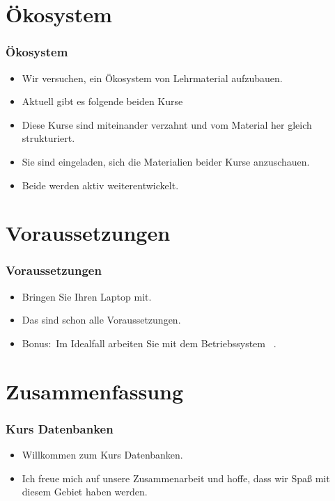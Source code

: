 \documentclass[aspectratio=169,mathserif,notheorems]{beamer}%
\begin{document}
\section{Ökosystem}%
%
\begin{frame}%
\frametitle{Ökosystem}%
\begin{itemize}%
\item Wir versuchen, ein Ökosystem von Lehrmaterial aufzubauen.%
\item<2-> Aktuell gibt es folgende beiden Kurse%
\item<5-> Diese Kurse sind miteinander verzahnt und vom Material her gleich strukturiert.%
\item<6-> Sie sind eingeladen, sich die Materialien beider Kurse anzuschauen.%
\item<7-> Beide werden aktiv weiterentwickelt.%
\end{itemize}%
\end{frame}%
%
%
\section{Voraussetzungen}%
%
\begin{frame}%
\frametitle{Voraussetzungen}%
\begin{itemize}%
\item Bringen Sie Ihren Laptop mit.%
\item<7-> Das sind schon alle Voraussetzungen.%
\item<8-> Bonus:~Im Idealfall arbeiten Sie mit dem Betriebssystem \ubuntu\ \linux\cite{CN2020ULB,H2020ULU2E}.%
\end{itemize}%
\end{frame}%
%
\section{Zusammenfassung}%
%
\begin{frame}\frametitle{Kurs Datenbanken}%
\begin{itemize}%
\item Willkommen zum Kurs \alert{Datenbanken}.%
\item<2-> Ich freue mich auf unsere Zusammenarbeit und hoffe, dass wir Spaß mit diesem Gebiet haben werden.%
\end{itemize}%
\end{frame}%
%
\endPresentation%
\end{document}
